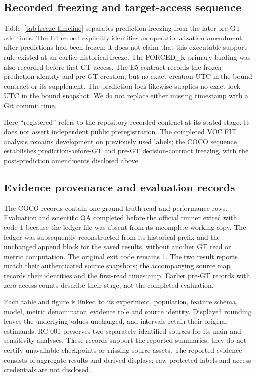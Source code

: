 \subsection{Recorded freezing and target-access sequence}
\label{sec:freeze-timeline}
Table~\ref{tab:freeze-timeline} separates prediction freezing from the later
pre-GT additions. The E4 record explicitly identifies an operationalization
amendment after predictions had been frozen; it does not claim that this
executable support rule existed at an earlier historical freeze. The
FORCED\_K primary binding was also recorded before first GT access. The E5
contract records the frozen prediction identity and pre-GT creation, but no
exact creation UTC in the bound contract or its supplement. The prediction
lock likewise supplies no exact lock UTC in the bound snapshot. We do not
replace either missing timestamp with a Git commit time.


Here ``registered'' refers to the repository-recorded contract at its stated
stage. It does not assert independent public preregistration. The completed
VOC FIT analysis remains development on previously used labels; the COCO
sequence establishes prediction-before-GT and pre-GT decision-contract
freezing, with the post-prediction amendments disclosed above.

\subsection{Evidence provenance and evaluation records}
The COCO records contain one ground-truth read and
 performance rows. Evaluation and scientific QA completed
before the official runner exited with code 1 because the ledger file was
absent from its incomplete working copy. The ledger was subsequently
reconstructed from its historical prefix and the unchanged append block
for the saved results, without another GT read or metric computation.
The original exit code remains 1. The two result reports match their
authenticated source snapshots; the accompanying source map records their
identities and the first-read timestamp. Earlier pre-GT records with zero
access counts describe their stage, not the completed evaluation.

Each table and figure is linked to its experiment, population, feature
schema, model, metric denominator, evidence role and source identity.
Displayed rounding leaves the underlying values unchanged, and intervals
retain their original estimands. RC-001 preserves two separately identified
sources for its main and sensitivity analyses. These records support the
reported summaries; they do not certify unavailable checkpoints or missing
source assets. The reported evidence consists of aggregate results and
derived displays; raw protected labels and access credentials are not
disclosed.
